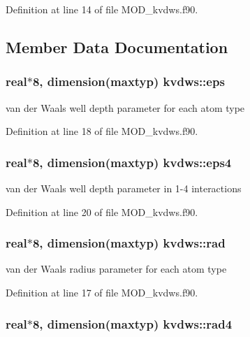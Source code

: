 Definition at line 14 of file M\-O\-D\-\_\-kvdws.\-f90.



\subsection{Member Data Documentation}
\hypertarget{classkvdws_ad41b05e196583b3801e848f38634cb12}{
\subsubsection[{eps}]{\setlength{\rightskip}{0pt plus 5cm}real$\ast$8, dimension(maxtyp) kvdws\-::eps}}\label{classkvdws_ad41b05e196583b3801e848f38634cb12}


van der Waals well depth parameter for each atom type 



Definition at line 18 of file M\-O\-D\-\_\-kvdws.\-f90.

\hypertarget{classkvdws_a13ae795c08066b577b8f2653e49b390c}{
\subsubsection[{eps4}]{\setlength{\rightskip}{0pt plus 5cm}real$\ast$8, dimension(maxtyp) kvdws\-::eps4}}\label{classkvdws_a13ae795c08066b577b8f2653e49b390c}


van der Waals well depth parameter in 1-\/4 interactions 



Definition at line 20 of file M\-O\-D\-\_\-kvdws.\-f90.

\hypertarget{classkvdws_a872caf055db208ba30e715cba39a8c48}{
\subsubsection[{rad}]{\setlength{\rightskip}{0pt plus 5cm}real$\ast$8, dimension(maxtyp) kvdws\-::rad}}\label{classkvdws_a872caf055db208ba30e715cba39a8c48}


van der Waals radius parameter for each atom type 



Definition at line 17 of file M\-O\-D\-\_\-kvdws.\-f90.

\hypertarget{classkvdws_a053949b49e313785d3ed38ddea00c9b1}{
\subsubsection[{rad4}]{\setlength{\rightskip}{0pt plus 5cm}real$\ast$8, dimension(maxtyp) kvdws\-::rad4}}\label{classkvdws_a053949b49e313785d3ed38ddea00c9b1}


